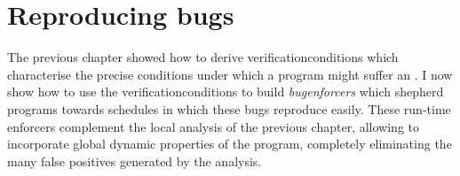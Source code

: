 \chapter{Reproducing bugs}
\label{sect:reproducing_bugs}

The previous chapter showed how to derive
\glspl{verificationcondition} which characterise the precise
conditions under which a program might suffer an .  I now show how to use the
\glspl{verificationcondition} to build \emph{\glspl{bugenforcer}}
which shepherd programs towards schedules in which these bugs
reproduce easily.  These run-time enforcers complement the local
analysis of the previous chapter, allowing {\technique} to incorporate
global dynamic properties of the program, completely eliminating the
many false positives generated by the {\StateMachine} analysis.

